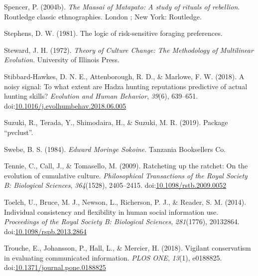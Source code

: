 \documentclass[
  11pt,
]{article}
\begin{document}
\leavevmode\hypertarget{ref-spencerMaasaiMatapatoStudy2004}{}%
Spencer, P. (2004b). \emph{The Maasai of Matapato: A study of rituals of
rebellion}. Routledge classic ethnographies. London ; New York:
Routledge.

\leavevmode\hypertarget{ref-stephens1981logic}{}%
Stephens, D. W. (1981). The logic of risk-sensitive foraging
preferences.

\leavevmode\hypertarget{ref-stewardTheoryCultureChange1972}{}%
Steward, J. H. (1972). \emph{Theory of Culture Change: The Methodology
of Multilinear Evolution}. University of Illinois Press.

\leavevmode\hypertarget{ref-stibbard-hawkesNoisySignalWhat2018}{}%
Stibbard-Hawkes, D. N. E., Attenborough, R. D., \& Marlowe, F. W.
(2018). A noisy signal: To what extent are Hadza hunting reputations
predictive of actual hunting skills? \emph{Evolution and Human
Behavior}, \emph{39}(6), 639--651.
doi:\href{https://doi.org/10.1016/j.evolhumbehav.2018.06.005}{10.1016/j.evolhumbehav.2018.06.005}

\leavevmode\hypertarget{ref-suzuki2019package}{}%
Suzuki, R., Terada, Y., Shimodaira, H., \& Suzuki, M. R. (2019). Package
``pvclust''.

\leavevmode\hypertarget{ref-swebeEdwardMoringeSokoine1984}{}%
Swebe, B. S. (1984). \emph{Edward Moringe Sokoine}. Tanzania Booksellers
Co.

\leavevmode\hypertarget{ref-tennieRatchetingRatchetEvolution2009}{}%
Tennie, C., Call, J., \& Tomasello, M. (2009). Ratcheting up the
ratchet: On the evolution of cumulative culture. \emph{Philosophical
Transactions of the Royal Society B: Biological Sciences},
\emph{364}(1528), 2405--2415.
doi:\href{https://doi.org/10.1098/rstb.2009.0052}{10.1098/rstb.2009.0052}

\leavevmode\hypertarget{ref-toelchIndividualConsistencyFlexibility2014a}{}%
Toelch, U., Bruce, M. J., Newson, L., Richerson, P. J., \& Reader, S. M.
(2014). Individual consistency and flexibility in human social
information use. \emph{Proceedings of the Royal Society B: Biological
Sciences}, \emph{281}(1776), 20132864.
doi:\href{https://doi.org/10.1098/rspb.2013.2864}{10.1098/rspb.2013.2864}

\leavevmode\hypertarget{ref-troucheVigilantConservatismEvaluating2018}{}%
Trouche, E., Johansson, P., Hall, L., \& Mercier, H. (2018). Vigilant
conservatism in evaluating communicated information. \emph{PLOS ONE},
\emph{13}(1), e0188825.
doi:\href{https://doi.org/10.1371/journal.pone.0188825}{10.1371/journal.pone.0188825}
\end{document}
